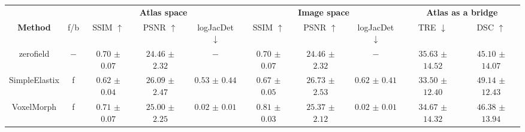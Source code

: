 \begin{table}[t]
{\begin{tabular}{c|c|ccc|ccc|cc}
        \toprule
        & & \multicolumn{3}{c|}{\textbf{Atlas space}} & \multicolumn{3}{c|}{\textbf{Image space}} & \multicolumn{2}{c}{\textbf{Atlas as a bridge}} \\
        \textbf{Method}& f/b & SSIM $\uparrow$& PSNR $\uparrow$& logJacDet $\downarrow$ & SSIM $\uparrow$& PSNR $\uparrow$& logJacDet $\downarrow$ & TRE $\downarrow$ & DSC $\uparrow$ \\
        \hline
        zerofield & $-$ & \makecell{$0.70$ \\ $\pm$ $0.07$} & \makecell{$24.46$ \\ $\pm$ $2.32$} & $-$ & \makecell{$0.70$ \\ $\pm$ $0.07$} & \makecell{$24.46$ \\ $\pm$ $2.32$} & $-$ & \makecell{$35.63$ \\ $\pm$ $14.52$}  & \makecell{$45.10$ \\ $\pm$ $14.07$} \\
        \cline{3-10}
        SimpleElastix & f & \makecell{$0.62$ \\ $\pm$ $0.04$} & \makecell{$26.09$ \\ $\pm$ $2.47$} & \makecell{$0.53$ \\ $\pm$ $0.44$} & \makecell{$0.67$ \\ $\pm$ $0.05$} & \makecell{$26.73$ \\ $\pm$ $2.53$} & \makecell{$0.62$ \\ $\pm$ $0.41$} &\makecell{$33.50$ \\ $\pm$ $12.40$} & \makecell{$49.14$ \\ $\pm$ $12.43$} \\
        \cline{3-10}
        VoxelMorph & f & \makecell{$0.71$ \\ $\pm$ $0.07$} & \makecell{$25.00$ \\ $\pm$ $2.25$} & \makecell{$\mathbf{0.02}$ \\ $\pm$ $\mathbf{0.01}$} & \makecell{$0.81$ \\ $\pm$ $0.03$} & \makecell{$25.37$ \\ $\pm$ $2.12$} & \makecell{$\mathbf{0.02}$ \\ $\pm$ $\mathbf{0.01}$} &\makecell{$34.67$ \\ $\pm$ $14.32$} & \makecell{$46.38$ \\ $\pm$ $13.94$} \\
        \cline{3-10}

\end{tabular}}
\end{table}

